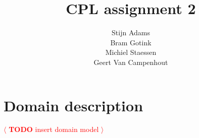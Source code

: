 \documentclass[a4paper,11pt]{article}
\newcommand{\todo}[1]{\textcolor{red}{\(\langle\) \textbf{TODO} #1 \(\rangle\) }}
\begin{document}
\title{CPL assignment 2}
\author{ Stijn Adams \\ Bram Gotink \\ Michiel Staessen \\ Geert Van Campenhout }

\maketitle

\tableofcontents

\clearpage

\section{Domain description}

\todo{insert domain model}
\end{document}
